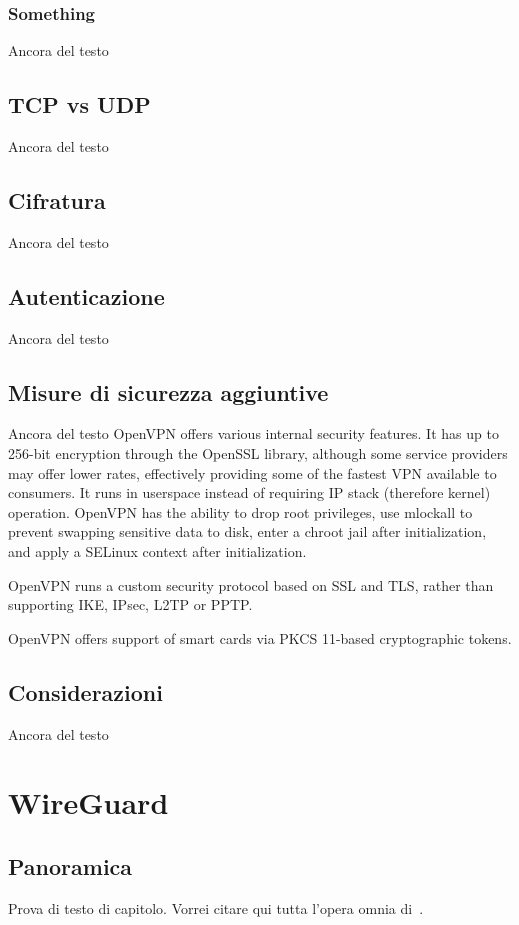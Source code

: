 \subsubsection{Something}
Ancora del testo

\subsection{TCP vs UDP}
Ancora del testo

\subsection{Cifratura}
Ancora del testo

\subsection{Autenticazione}
Ancora del testo

\subsection{Misure di sicurezza aggiuntive}
Ancora del testo
OpenVPN offers various internal security features. It has up to 256-bit encryption through the OpenSSL library, although some service providers may offer lower rates, effectively providing some of the fastest VPN available to consumers. It runs in userspace instead of requiring IP stack (therefore kernel) operation. OpenVPN has the ability to drop root privileges, use mlockall to prevent swapping sensitive data to disk, enter a chroot jail after initialization, and apply a SELinux context after initialization.

OpenVPN runs a custom security protocol based on SSL and TLS, rather than supporting IKE, IPsec, L2TP or PPTP.

OpenVPN offers support of smart cards via PKCS 11-based cryptographic tokens.
\subsection{Considerazioni}
Ancora del testo

\section{WireGuard}
\subsection{Panoramica}
Prova di testo di capitolo. Vorrei citare qui tutta l'opera omnia di~\cite{IEEE:1990,WIKI:INTEROP,BOX:1997,AHL:1996}.


